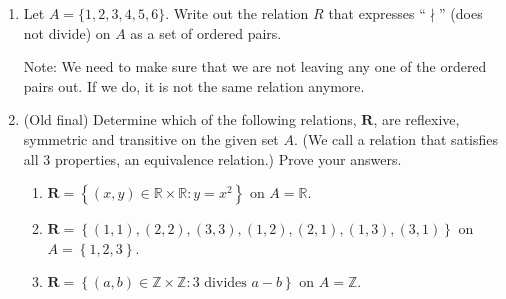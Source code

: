 \documentclass[12pt]{article}
\newcommand{\set}[1]{\left\{ #1 \right\}}
\begin{document}
\begin{enumerate}[resume]
\item Let $A =\{1,2,3,4,5,6\}$. Write out the relation $R$ that expresses ``$\nmid$'' (does not divide) on $A$ as a set of ordered pairs.



Note: We need to make sure that we are not leaving any one of the ordered pairs out. If we do, it is not the same relation anymore.

\item (Old final) Determine which of the following relations, $\mathbf{R}$, are reflexive, symmetric and transitive on the given set $A$. (We call a relation that satisfies all 3 properties, an equivalence relation.) Prove your answers.

\begin{enumerate}

\item  $\mathbf{R}=\set{(x,y)\in\mathbb R\times \mathbb R\colon y=x^2}$ on $A=\mathbb R$.

\item  $\mathbf{R}=\set{(1,1),(2,2),(3,3),(1,2),(2,1),(1,3),(3,1)}$ on $A=\set{1,2,3}$.

\item  $\mathbf{R}=\set{(a,b)\in\mathbb Z\times \mathbb Z\colon 3 \text{ divides } a-b}$ on $A=\mathbb Z$.

\end{enumerate}

%
%
%
%
%
%
%
%



\end{enumerate}
\end{document}
